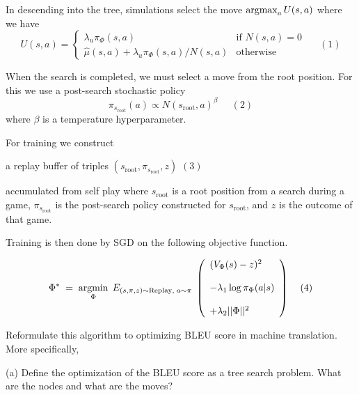 \medskip
In descending into the tree, simulations select the move $\operatorname*{argmax}_a U(s,a)$ where we have
$$U(s,a) =  \left\{\begin{array}{ll}\lambda_u \pi_\Phi(s,a) &\mbox{if $N(s,a) = 0$} \\ \hat{\mu}(s,a) + \lambda_u \pi_\Phi(s,a)/N(s,a) & \mbox{otherwise} \end{array}\right.\;\;\;\;\;(1)$$

\medskip
When the search is completed, we must select a move from the root position.  For this we use a post-search stochastic policy
$$\pi_{s_{\mathrm{root}}}(a) \propto N(s_{\mathrm{root}},a)^\beta\;\;\;\;\;(2)$$
where $\beta$ is a temperature hyperparameter.

\medskip
For training we construct

\medskip
\centerline{a replay buffer of triples $(s_{\mathrm{root}},\pi_{s_{\mathrm{root}}},z)$ \hspace{2em}$(3)$}

\medskip
accumulated from self play where $s_{\mathrm{root}}$ is a root position from a search during a game,
$\pi_{s_{\mathrm{root}}}$ is the post-search policy constructed for $s_{\mathrm{root}}$, and $z$ is the outcome of that game.

\medskip
Training is then done by SGD on the following objective function.

$$\Phi^*\; = \;\operatorname*{argmin}_\Phi \;E_{(s,\pi,z) \sim \mathrm{Replay},\;a \sim \pi}\;\left(\begin{array}{l} (V_\Phi(s) - z)^2 \\ \\ - \lambda_1\log \pi_\Phi(a|s) \\ \\ + \lambda_2||\Phi||^2\end{array}\right)\;\;\;\;(4)$$

\bigskip


Reformulate this algorithm to optimizing BLEU score in machine translation. More specifically,

\medskip
(a) Define the optimization of the BLEU score as a tree search problem.  What are the nodes and what are the moves?


